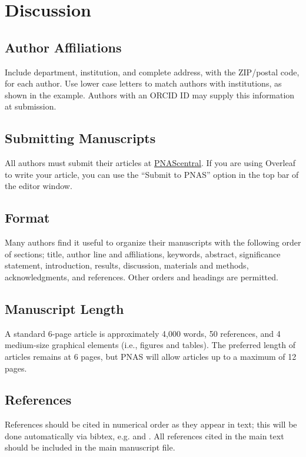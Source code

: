 \documentclass[9pt,twocolumn,twoside,lineno]{pnas-new}
\begin{document}
\section*{Discussion}

\subsection*{Author Affiliations}

Include department, institution, and complete address, with the ZIP/postal code, for each author. Use lower case letters to match authors with institutions, as shown in the example. Authors with an ORCID ID may supply this information at submission.

\subsection*{Submitting Manuscripts}

All authors must submit their articles at \href{http://www.pnascentral.org/cgi-bin/main.plex}{PNAScentral}. If you are using Overleaf to write your article, you can use the ``Submit to PNAS'' option in the top bar of the editor window. 

\subsection*{Format}

Many authors find it useful to organize their manuscripts with the following order of sections;  title, author line and affiliations, keywords, abstract, significance statement, introduction, results, discussion, materials and methods, acknowledgments, and references. Other orders and headings are permitted.

\subsection*{Manuscript Length}

A standard 6-page article is approximately 4,000 words, 50 references, and 4 medium-size graphical elements (i.e., figures and tables). The preferred length of articles remains at 6 pages, but PNAS will allow articles up to a maximum of 12 pages.

\subsection*{References}

References should be cited in numerical order as they appear in text; this will be done automatically via bibtex, e.g. \cite{belkin2002using} and \cite{berard1994embedding,coifman2005geometric}. All references cited in the main text should be included in the main manuscript file.
\end{document}
